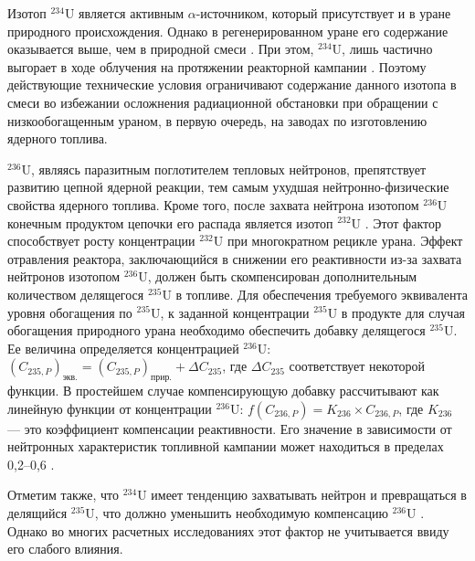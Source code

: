 Изотоп $^{234}$U является активным $\alpha$-источником, который присутствует и в уране природного происхождения. Однако в регенерированном уране его содержание оказывается выше, чем в природной смеси \cite{matveev2024Uran232EgoVliyanie1985,kryuchkovObogashchennyyUranDobavleniem2007}. При этом, $^{234}$U, лишь частично выгорает в ходе облучения на протяжении реакторной кампании \cite{gresleyEnrichingRecyclingUranium1988}. Поэтому действующие технические условия ограничивают содержание данного изотопа в смеси во избежании осложнения радиационной обстановки при обращении с низкообогащенным ураном, в первую очередь, на заводах по изготовлению ядерного топлива.

$^{236}$U, являясь паразитным поглотителем тепловых нейтронов, препятствует развитию цепной ядерной реакции, тем самым ухудшая нейтронно-физические свойства ядерного топлива. Кроме того, после захвата нейтрона изотопом  $^{236}$U конечным продуктом цепочки его распада является изотоп  $^{232}$U \cite{ksenof88}. Этот фактор способствует росту концентрации $^{232}$U при многократном рецикле урана. 
Эффект отравления реактора, заключающийся в снижении его реактивности из-за захвата нейтронов изотопом  $^{236}$U, должен быть скомпенсирован дополнительным количеством делящегося $^{235}$U в топливе. Для обеспечения требуемого эквивалента уровня обогащения по $^{235}$U, к заданной концентрации $^{235}$U в продукте для случая обогащения природного урана необходимо обеспечить добавку делящегося $^{235}$U.
Ее величина определяется концентрацией $^{236}$U:
$(C_{235,P})_\textit{экв.}=(C_{235,P})_\textit{прир.}+\Delta C_{235}$, где $\Delta C_{235}$ соответствует некоторой функции. В простейшем случае компенсирующую добавку рассчитывают как линейную функции от концентрации $^{236}$U: $f(C_{236,P})=K_{236} \times C_{236,P}$, где $K_{236}$ --- это коэффициент компенсации реактивности. Его значение в зависимости от нейтронных характеристик топливной кампании может находиться в пределах 0,2--0,6 \cite{delagarzaMulticomponentIsotopeSeparation1961, borodynyaIssledovanieProblemyVovlecheniya1989,delculAnalysisReuseUranium2009}.


Отметим также, что $^{234}$U имеет тенденцию захватывать нейтрон и превращаться в делящийся $^{235}$U, что должно уменьшить необходимую компенсацию $^{236}$U \cite{dyachenkoIspolzovanieRegenerirovannogoUrana2012}. Однако во многих расчетных исследованиях этот фактор не учитывается ввиду его слабого влияния.


